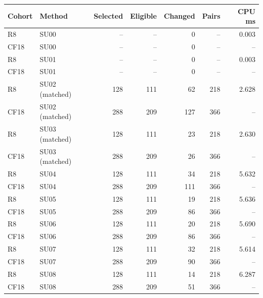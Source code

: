 \begin{tabular}{llrrrrr}
\toprule
Cohort & Method & Selected & Eligible & Changed & Pairs & CPU ms \\
\midrule
R8 & SU00 & -- & -- & 0 & -- & 0.003 \\
CF18 & SU00 & -- & -- & 0 & -- & -- \\
R8 & SU01 & -- & -- & 0 & -- & 0.003 \\
CF18 & SU01 & -- & -- & 0 & -- & -- \\
R8 & SU02 (matched) & 128 & 111 & 62 & 218 & 2.628 \\
CF18 & SU02 (matched) & 288 & 209 & 127 & 366 & -- \\
R8 & SU03 (matched) & 128 & 111 & 23 & 218 & 2.630 \\
CF18 & SU03 (matched) & 288 & 209 & 26 & 366 & -- \\
R8 & SU04 & 128 & 111 & 34 & 218 & 5.632 \\
CF18 & SU04 & 288 & 209 & 111 & 366 & -- \\
R8 & SU05 & 128 & 111 & 19 & 218 & 5.636 \\
CF18 & SU05 & 288 & 209 & 86 & 366 & -- \\
R8 & SU06 & 128 & 111 & 20 & 218 & 5.690 \\
CF18 & SU06 & 288 & 209 & 86 & 366 & -- \\
R8 & SU07 & 128 & 111 & 32 & 218 & 5.614 \\
CF18 & SU07 & 288 & 209 & 90 & 366 & -- \\
R8 & SU08 & 128 & 111 & 14 & 218 & 6.287 \\
CF18 & SU08 & 288 & 209 & 51 & 366 & -- \\
\bottomrule
\end{tabular}
